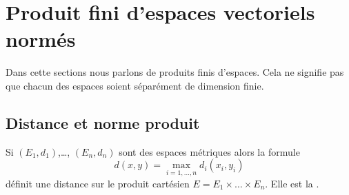 \section{Produit fini d'espaces vectoriels normés}
\label{sec_prod}

Dans cette sections nous parlons de produits finis d'espaces. Cela ne signifie pas que chacun des espaces soient séparément de dimension finie.

\subsection{Distance et norme produit}

\begin{propositionDef}    \label{DefZTHxrHA}
    Si \( (E_1,d_1)\),\ldots, \( (E_n,d_n)\) sont des espaces métriques alors la formule
    \begin{equation} 
        d(x,y)=\max_{i=1,\ldots, n}d_i(x_i,y_i)
    \end{equation}
    définit une distance sur le produit cartésien \( E=E_1\times\ldots\times E_n\). Elle est la .
\end{propositionDef}

